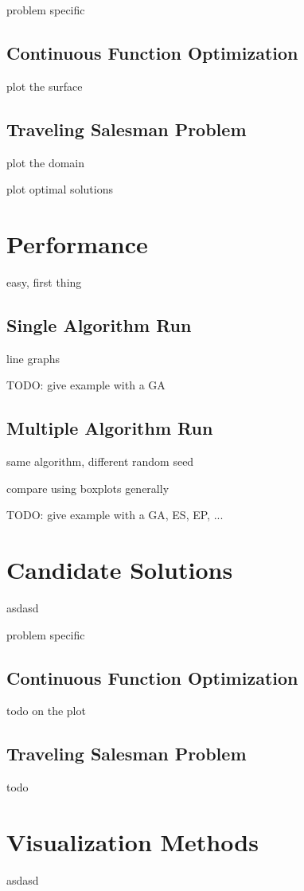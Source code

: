 \documentclass[a4paper, 11pt]{article}
\begin{document}
problem specific

\subsection{Continuous Function Optimization}

plot the surface


\subsection{Traveling Salesman Problem}

plot the domain

plot optimal solutions


%
%
\section{Performance}
easy, first thing

\subsection{Single Algorithm Run}
line graphs

TODO: give example with a GA

\subsection{Multiple Algorithm Run}
same algorithm, different random seed

compare using boxplots generally

TODO: give example with a GA, ES, EP, ...


%
%
\section{Candidate Solutions}
asdasd

problem specific

\subsection{Continuous Function Optimization}
todo
on the plot

\subsection{Traveling Salesman Problem}
todo

%
%
\section{Visualization Methods}
asdasd
\end{document}
